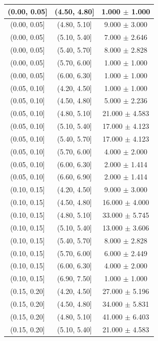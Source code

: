 \begin{longtable}{|c|c|c|}
\hline
\endlastfoot
(0.00, 0.05] & (4.50, 4.80] & 1.000 $\pm$ 1.000 \\ 
\hline
(0.00, 0.05] & (4.80, 5.10] & 9.000 $\pm$ 3.000 \\ 
\hline
(0.00, 0.05] & (5.10, 5.40] & 7.000 $\pm$ 2.646 \\ 
\hline
(0.00, 0.05] & (5.40, 5.70] & 8.000 $\pm$ 2.828 \\ 
\hline
(0.00, 0.05] & (5.70, 6.00] & 1.000 $\pm$ 1.000 \\ 
\hline
(0.00, 0.05] & (6.00, 6.30] & 1.000 $\pm$ 1.000 \\ 
\hline
(0.05, 0.10] & (4.20, 4.50] & 1.000 $\pm$ 1.000 \\ 
\hline
(0.05, 0.10] & (4.50, 4.80] & 5.000 $\pm$ 2.236 \\ 
\hline
(0.05, 0.10] & (4.80, 5.10] & 21.000 $\pm$ 4.583 \\ 
\hline
(0.05, 0.10] & (5.10, 5.40] & 17.000 $\pm$ 4.123 \\ 
\hline
(0.05, 0.10] & (5.40, 5.70] & 17.000 $\pm$ 4.123 \\ 
\hline
(0.05, 0.10] & (5.70, 6.00] & 4.000 $\pm$ 2.000 \\ 
\hline
(0.05, 0.10] & (6.00, 6.30] & 2.000 $\pm$ 1.414 \\ 
\hline
(0.05, 0.10] & (6.60, 6.90] & 2.000 $\pm$ 1.414 \\ 
\hline
(0.10, 0.15] & (4.20, 4.50] & 9.000 $\pm$ 3.000 \\ 
\hline
(0.10, 0.15] & (4.50, 4.80] & 16.000 $\pm$ 4.000 \\ 
\hline
(0.10, 0.15] & (4.80, 5.10] & 33.000 $\pm$ 5.745 \\ 
\hline
(0.10, 0.15] & (5.10, 5.40] & 13.000 $\pm$ 3.606 \\ 
\hline
(0.10, 0.15] & (5.40, 5.70] & 8.000 $\pm$ 2.828 \\ 
\hline
(0.10, 0.15] & (5.70, 6.00] & 6.000 $\pm$ 2.449 \\ 
\hline
(0.10, 0.15] & (6.00, 6.30] & 4.000 $\pm$ 2.000 \\ 
\hline
(0.10, 0.15] & (6.90, 7.50] & 1.000 $\pm$ 1.000 \\ 
\hline
(0.15, 0.20] & (4.20, 4.50] & 27.000 $\pm$ 5.196 \\ 
\hline
(0.15, 0.20] & (4.50, 4.80] & 34.000 $\pm$ 5.831 \\ 
\hline
(0.15, 0.20] & (4.80, 5.10] & 41.000 $\pm$ 6.403 \\ 
\hline
(0.15, 0.20] & (5.10, 5.40] & 21.000 $\pm$ 4.583 \\ 
\hline

\end{longtable}
